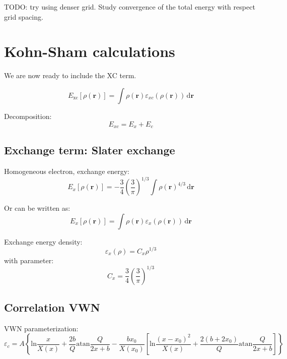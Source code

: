 TODO: try using denser grid. Study convergence of the total energy with respect
grid spacing.




\section{Kohn-Sham calculations}

We are now ready to include the XC term.

\begin{equation}
E_{\mathrm{xc}}[\rho(\mathbf{r})] = \int \rho(\mathbf{r})
\varepsilon_{xc}(\rho(\mathbf{r}))\,\mathrm{d}\mathbf{r}
\end{equation}

Decomposition:
\begin{equation}
E_{xc} = E_{x} + E_{c}
\end{equation}

\subsection{Exchange term: Slater exchange}

Homogeneous electron, exchange energy:
\begin{equation}
E_{x}[\rho(\mathbf{r})] = -\frac{3}{4} \left(\frac{3}{\pi}\right)^{1/3}
\int \rho(\mathbf{r})^{4/3}\,\mathrm{d}\mathbf{r}
\end{equation}

Or can be written as:
\begin{equation}
E_{x}[\rho(\mathbf{r})] = \int \rho(\mathbf{r}) \varepsilon_{x}(\rho(\mathbf{r}))\,\mathrm{d}\mathbf{r}
\end{equation}

Exchange energy density:
\begin{equation}
\varepsilon_{x}(\rho) = C_{x}\rho^{1/3}
\end{equation}
with parameter:
\begin{equation}
C_{x} = \frac{3}{4}\left(\frac{3}{\pi}\right)^{1/3}  
\end{equation}


\subsection{Correlation VWN}

VWN parameterization:
\begin{equation}
\varepsilon_{c} = A \left\{
\mathrm{ln}\frac{x}{X(x)} + \frac{2b}{Q}\mathrm{atan}\frac{Q}{2x+b}
- \frac{bx_{0}}{X(x_{0})}\left[
\mathrm{ln}\frac{(x - x_0)^2}{X(x)} + \frac{2(b + 2x_0)}{Q}\mathrm{atan}\frac{Q}{2x + b}
\right]
\right\}
\end{equation}

